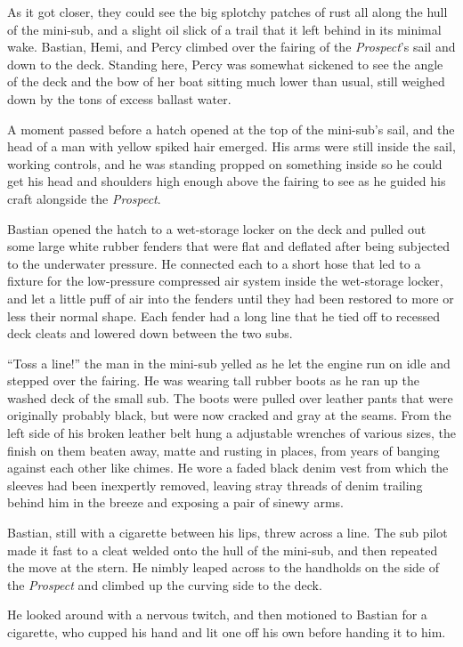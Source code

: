 \documentclass[
]{scrbook}
\begin{document}
As it got closer, they could see the big splotchy patches of rust all
along the hull of the mini-sub, and a slight oil slick of a trail that
it left behind in its minimal wake. Bastian, Hemi, and Percy climbed
over the fairing of the \emph{Prospect}'s sail and down to the deck.
Standing here, Percy was somewhat sickened to see the angle of the deck
and the bow of her boat sitting much lower than usual, still weighed
down by the tons of excess ballast water.

A moment passed before a hatch opened at the top of the mini-sub's sail,
and the head of a man with yellow spiked hair emerged. His arms were
still inside the sail, working controls, and he was standing propped on
something inside so he could get his head and shoulders high enough
above the fairing to see as he guided his craft alongside the
\emph{Prospect}.

Bastian opened the hatch to a wet-storage locker on the deck and pulled
out some large white rubber fenders that were flat and deflated after
being subjected to the underwater pressure. He connected each to a short
hose that led to a fixture for the low-pressure compressed air system
inside the wet-storage locker, and let a little puff of air into the
fenders until they had been restored to more or less their normal shape.
Each fender had a long line that he tied off to recessed deck cleats and
lowered down between the two subs.

``Toss a line!'' the man in the mini-sub yelled as he let the engine run
on idle and stepped over the fairing. He was wearing tall rubber boots
as he ran up the washed deck of the small sub. The boots were pulled
over leather pants that were originally probably black, but were now
cracked and gray at the seams. From the left side of his broken leather
belt hung a adjustable wrenches of various sizes, the finish on them
beaten away, matte and rusting in places, from years of banging against
each other like chimes. He wore a faded black denim vest from which the
sleeves had been inexpertly removed, leaving stray threads of denim
trailing behind him in the breeze and exposing a pair of sinewy arms.

Bastian, still with a cigarette between his lips, threw across a line.
The sub pilot made it fast to a cleat welded onto the hull of the
mini-sub, and then repeated the move at the stern. He nimbly leaped
across to the handholds on the side of the \emph{Prospect} and climbed
up the curving side to the deck.

He looked around with a nervous twitch, and then motioned to Bastian for
a cigarette, who cupped his hand and lit one off his own before handing
it to him.
\end{document}
